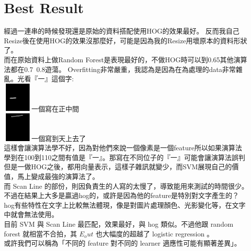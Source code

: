 \documentclass[12pt]{article}
\theoremstyle{definition}
\theoremstyle{remark}
\begin{document}
\section{Best Result}
經過一連串的時候發現還是原始的資料搭配使用HOG的效果最好。
反而我自己Resize後在使用HOG的效果沒那麼好，可能是因為我的Resize用壞原本的資料形狀了。\\
而在原始資料上做Random Forest是表現最好的，不做HOG時可以到0.65其他演算法都在0.7~0.8遊蕩。
Overfitting非常嚴重，我認為是因為在為處理的data非常雜亂。光看『一』這個字:\\
\includegraphics[width=1.5cm, height=1.5cm]{./photo44.jpg}一個寫在正中間\\
\includegraphics[width=1.5cm, height=1.5cm]{./photo228.jpg}一個寫到天上去了\\
這樣會讓演算法學不好，因為對他們來說一個像素是一個feature所以如果演算法學到在100到110之間有值是『一』。那寫在不同位子的『一』可能會讓演算法誤判\\
但是一做HOG之後，都用向量表示，這樣子雜訊就變少，而SVM展現自己的價值，馬上變成最強的演算法了。\\
而 Scan Line 的部份，則因負責生的人寫的太慢了，導致能用來測試的時間很少。
不過在結果上大多是贏過hog的，或許是因為他的feature是特別對文字產生的？hog有些特性在文字上比較無法體現，像是對圖片處理顏色、光影變化等，在文字中就會無法使用。\\
目前 SVM 與 Scan Line 最匹配，效果最好，與 hog 類似。不過他跟 random forest 就相當不合拍，其 $E_out$ 也大幅度的超越了 logistic regression 。\\
或許我們可以稱為「不同的 feature 對不同的 learner 適應性可能有顯著差異」。
\end{document}
